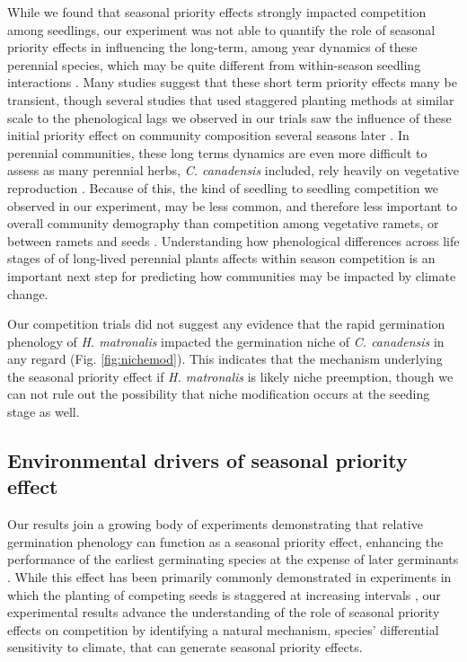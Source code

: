 \documentclass{article}[11pt]
\begin{document}
While we found that seasonal priority effects strongly impacted competition among seedlings, our experiment was not able to quantify the role of seasonal priority effects in influencing the long-term, among year dynamics of these perennial species, which may be quite different from within-season seedling interactions \citep{}. Many studies suggest that these short term priority effects many be transient, though several studies that used staggered planting methods at similar scale to the phenological lags we observed in our trials saw the influence of these initial priority effect on community composition several seasons later \citep{Weidlich:2020aa}.  In perennial communities, these long terms dynamics are even more difficult to assess as many perennial herbs, \textit{C. canadensis} included, rely heavily on vegetative reproduction \citep{Hawkins:2005ve}. Because of this, the kind of seedling to seedling competition we observed in our experiment, may be less common, and therefore less important to overall community demography than competition among vegetative ramets, or between ramets and seeds \citep{}. Understanding how phenological differences across life stages of of long-lived perennial plants affects within season competition is an important next step for predicting how communities may be impacted by climate change.

Our competition trials did not suggest any evidence that the rapid germination phenology of \textit{H. matronalis} impacted the germination niche of \textit{C. canadensis} in any regard (Fig. \ref{fig:nichemod}). This indicates that the mechanism underlying the seasonal priority effect if \textit{H. matronalis} is likely niche preemption, though we can not rule out the possibility that niche modification occurs at the seeding stage as well. %

\subsection*{Environmental drivers of seasonal priority effect}
Our results join a growing body of experiments demonstrating that relative germination phenology can function as a seasonal priority effect, enhancing the performance of the earliest germinating species at the expense of later germinants \citep{Korner2008,Dickson2012,Ross1972}. While this effect has been primarily commonly demonstrated in experiments in which the planting of competing seeds is staggered at increasing intervals \citep{Young:2017aa,Weidlich:2020aa}, our experimental results advance the understanding of the role of seasonal priority effects on competition by identifying a natural mechanism, species' differential sensitivity to climate, that can generate seasonal priority effects.
\end{document}
